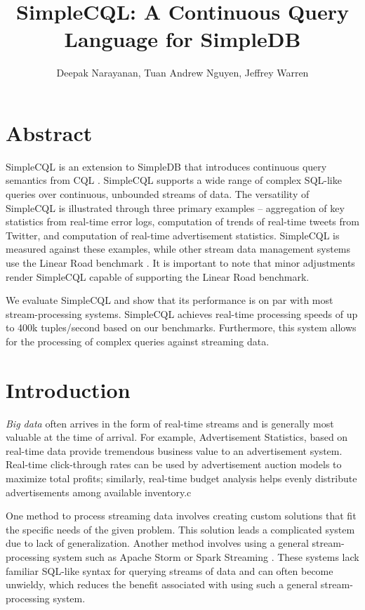\documentclass[a4paper, 10pt, conference]{IEEEconf}
\title{\LARGE \bf SimpleCQL: A Continuous Query Language for SimpleDB}
\author{Deepak Narayanan, Tuan Andrew Nguyen, Jeffrey Warren}
\begin{document}
\maketitle
\thispagestyle{empty}
\pagestyle{empty}


\section*{Abstract}

SimpleCQL is an extension to SimpleDB \cite{simpledb} that introduces continuous query semantics from CQL \cite{cql}. SimpleCQL supports a wide range of complex SQL-like queries over continuous, unbounded streams of data.  The versatility of SimpleCQL is illustrated through three primary examples -- aggregation of key statistics from real-time error logs, computation of trends of real-time tweets from Twitter, and computation of real-time advertisement statistics.  SimpleCQL is measured against these examples, while other stream data management systems use the Linear Road benchmark \cite{linear}.  It is important to note that minor adjustments render SimpleCQL capable of supporting the Linear Road benchmark.

We evaluate SimpleCQL and show that its performance is on par with most stream-processing systems.  SimpleCQL achieves real-time processing speeds of up to 400k tuples/second based on our benchmarks.  Furthermore, this system allows for the processing of complex queries against streaming data.

\section{Introduction}

\textit{Big data} often arrives in the form of real-time streams and is generally most valuable at the time of arrival. For example, Advertisement Statistics, based on real-time data provide tremendous business value to an advertisement system.  Real-time click-through rates can be used by advertisement auction models to maximize total profits; similarly, real-time budget analysis helps evenly distribute advertisements among available inventory.c

One method to process streaming data involves creating custom solutions that fit the specific needs of the given problem.  This solution leads a complicated system due to lack of generalization.  Another method involves using a general stream-processing system such as Apache Storm \cite{storm} or Spark Streaming \cite{spark_streaming}.  These systems lack familiar SQL-like syntax for querying streams of data and can often become unwieldy, which reduces the benefit associated with using such a general stream-processing system.
\end{document}
